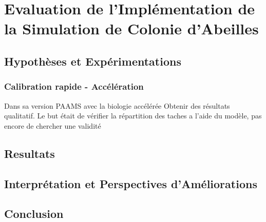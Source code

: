 \chapter{Evaluation de l'Implémentation de la Simulation de Colonie d'Abeilles}
	\section{Hypothèses et Expérimentations}
	
		\subsection{Calibration rapide - Accélération}
			Dans sa version PAAMS avec la biologie accélérée
			Obtenir des résultats qualitatif. Le but était de vérifier la répartition des taches a l'aide du modèle, pas encore de chercher une validité
	\section{Resultats}
	\section{Interprétation et Perspectives d'Améliorations}
			
	\section*{Conclusion}